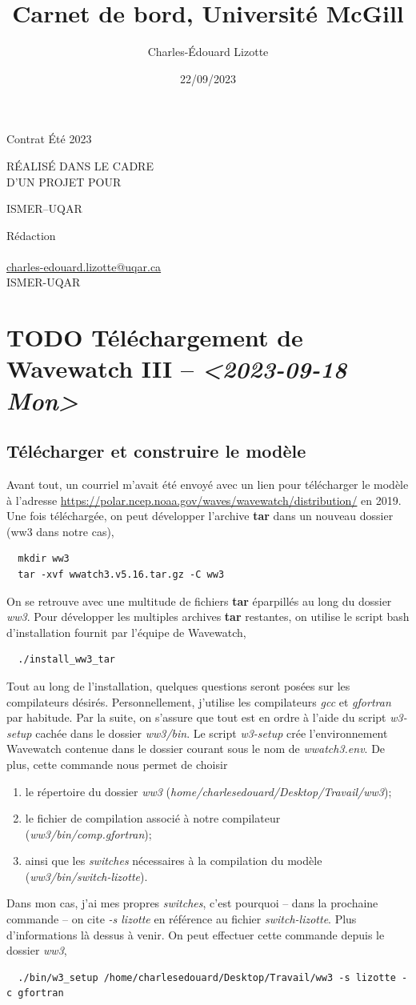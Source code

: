 \documentclass[10pt]{article}
\author{Charles-Édouard Lizotte}
\date{22/09/2023}
\title{Carnet de bord, Université McGill}
\makeatletter
\numberwithin{equation}{section}
\newcommand{\mytitlepage}{
\begin{titlepage}
\begin{center}
{\Large Contrat Été 2023 \par}
\vspace{2cm}
{\Large \MakeUppercase{\thetitle} \par}
\vspace{2cm}
RÉALISÉ DANS LE CADRE\\ D'UN PROJET POUR \par
\vspace{2cm}
{\Large ISMER--UQAR \par}
\vspace{2cm}
{\thedate}
\end{center}
\vfill
Rédaction \\
{\theauthor}\\
\url{charles-edouard.lizotte@uqar.ca}\\
ISMER-UQAR
\end{titlepage}
}
\makeatother
\begin{document}
\mytitlepage
\tableofcontents\newpage

\section{{\bfseries\sffamily TODO} Téléchargement de Wavewatch III -- \textit{<2023-09-18 Mon>}}
\label{sec:org82c9ef7}
\subsection{Télécharger et construire le modèle}
\label{sec:org313555f}
Avant tout, un courriel m'avait été envoyé avec un lien pour télécharger le modèle à l'adresse \url{https://polar.ncep.noaa.gov/waves/wavewatch/distribution/} en 2019.
Une fois téléchargée, on peut développer l'archive \textbf{tar} dans un nouveau dossier (ww3 dans notre cas),
\begin{verbatim}
  mkdir ww3
  tar -xvf wwatch3.v5.16.tar.gz -C ww3
\end{verbatim}
On se retrouve avec une multitude de fichiers \textbf{tar} éparpillés au long du dossier \emph{ww3}. 
Pour développer les multiples archives \textbf{tar} restantes, on utilise le script bash d'installation fournit par l'équipe de Wavewatch,
\begin{verbatim}
  ./install_ww3_tar 
\end{verbatim}
Tout au long de l'installation, quelques questions seront posées sur les compilateurs désirés. Personnellement, j'utilise les compilateurs \emph{gcc} et \emph{gfortran} par habitude.
Par la suite, on s'assure que tout est en ordre à l'aide du script \emph{w3-setup} cachée dans le dossier \emph{ww3/bin}.
Le script \emph{w3-setup} crée l'environnement Wavewatch contenue dans le dossier courant sous le nom de \emph{wwatch3.env}.
De plus, cette commande nous permet de choisir
\begin{enumerate}
\item le répertoire du dossier \emph{ww3} (\emph{home/charlesedouard/Desktop/Travail/ww3});
\item le fichier de compilation associé à notre compilateur (\emph{ww3/bin/comp.gfortran});
\item ainsi que les \emph{switches} nécessaires à la compilation du modèle (\emph{ww3/bin/switch-lizotte}).
\end{enumerate}
Dans mon cas, j'ai mes propres \emph{switches}, c'est pourquoi -- dans la prochaine commande -- on cite \emph{-s lizotte} en référence au fichier \emph{switch-lizotte}.
Plus d'informations là dessus à venir. 
On peut effectuer cette commande depuis le dossier \emph{ww3},
\begin{verbatim}
  ./bin/w3_setup /home/charlesedouard/Desktop/Travail/ww3 -s lizotte -c gfortran
\end{verbatim}
\end{document}

